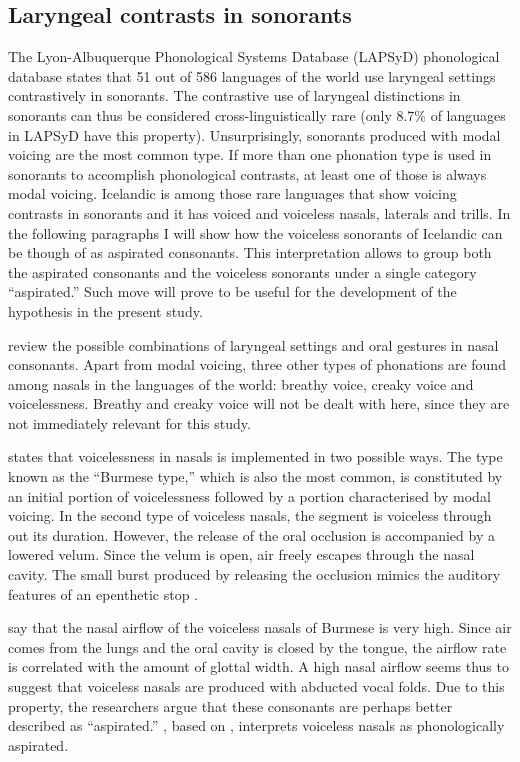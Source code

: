 \documentclass[11pt,a4paper,openany]{memoir}\usepackage[]{graphicx}\usepackage[]{color}
\begin{document}
\subsection{Laryngeal contrasts in sonorants}
The Lyon-Albuquerque Phonological Systems Database (LAPSyD) phonological database \citep{Maddieson2012} states that 51 out of 586 languages of the world use laryngeal settings contrastively in sonorants.
The contrastive use of laryngeal distinctions in sonorants can thus be considered cross-linguistically rare (only 8.7\% of languages in LAPSyD have this property).
Unsurprisingly, sonorants produced with modal voicing are the most common type.
If more than one phonation type is used in sonorants to accomplish phonological contrasts, at least one of those is always modal voicing.
Icelandic is among those rare languages that show voicing contrasts in sonorants and it has voiced and voiceless nasals, laterals and trills.
In the following paragraphs I will show how the voiceless sonorants of Icelandic can be though of as aspirated consonants.
This interpretation allows to group both the aspirated consonants and the voiceless sonorants under a single category ``aspirated.''
Such move will prove to be useful for the development of the hypothesis in the present study.

\citet{ladefoged1996} review the possible combinations of laryngeal settings and oral gestures in nasal consonants.
Apart from modal voicing, three other types of phonations are found among nasals in the languages of the world: breathy voice, creaky voice and voicelessness.
Breathy and creaky voice will not be dealt with here, since they are not immediately relevant for this study.

\citet{bhaskararao1991} states that voicelessness in nasals is implemented in two possible ways.
The type known as the ``Burmese type,'' which is also the most common, is constituted by an initial portion of voicelessness followed by a portion characterised by modal voicing.
In the second type of voiceless nasals, the segment is voiceless through out its duration.
However, the release of the oral occlusion is accompanied by a lowered velum.
Since the velum is open, air freely escapes through the nasal cavity.
The small burst produced by releasing the occlusion mimics the auditory features of an epenthetic stop \citep[84]{bhaskararao1991}.

\citet[111]{ladefoged1996} say that the nasal airflow of the voiceless nasals of Burmese is very high.
Since air comes from the lungs and the oral cavity is closed by the tongue, the airflow rate is correlated with the amount of glottal width.
A high nasal airflow seems thus to suggest that voiceless nasals are produced with abducted vocal folds.
Due to this property, the researchers argue that these consonants are perhaps better described as ``aspirated.''
\citet[82]{kehrein2002}, based on \citet{ladefoged1996}, interprets voiceless nasals as phonologically aspirated.
\end{document}
